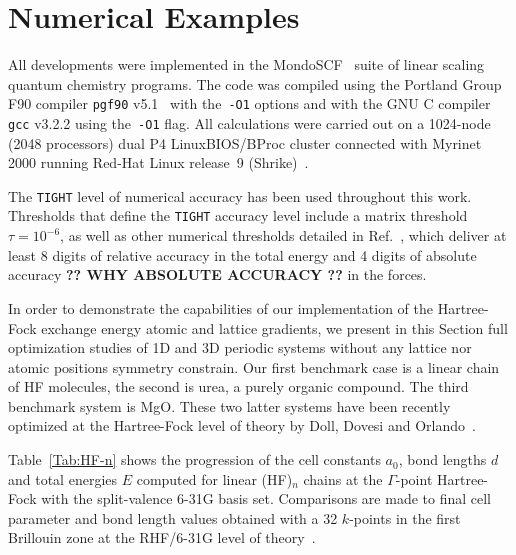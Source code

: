 \documentclass[prl,twocolumn,showpacs,twocolumngrid,superbib]{revtex4}
\begin{document}
\section{Numerical Examples}\label{Sec:NumExamples}
All developments were implemented in the MondoSCF~\cite{MondoSCF} suite of
linear scaling quantum chemistry programs. The code was compiled 
using the Portland Group F90 compiler {\tt pgf90} v5.1~\cite{pgf90} 
with the~{\tt -O1} options and with the GNU C compiler {\tt gcc} 
v3.2.2 using the~{\tt -O1} flag.
All calculations were carried out on a 1024-node (2048 processors)
dual P4 LinuxBIOS/BProc cluster connected with Myrinet 2000 running
Red-Hat Linux release~9 (Shrike)~\cite{RedHat90}.


The {\tt TIGHT} level of numerical accuracy has been used throughout this work.  
Thresholds that define the {\tt TIGHT} accuracy level include a matrix 
threshold $\tau=10^{-6}$, as well as other numerical thresholds 
detailed in Ref.~\cite{CTymczak04a}, which deliver at least 8 digits of 
relative accuracy in the total energy and 4 digits of absolute accuracy 
{\bf ?? WHY ABSOLUTE ACCURACY ??} in the forces.  

In order to demonstrate the capabilities of our implementation of the
Hartree-Fock exchange energy atomic and lattice gradients, we present in this Section 
full optimization studies of 1D and 3D periodic systems without any lattice 
nor atomic positions symmetry constrain. 
Our first benchmark case is a linear chain of HF molecules, the second is
urea, a purely organic compound. The third benchmark system is MgO. 
These two latter systems have been recently optimized at the Hartree-Fock 
level of theory by Doll, Dovesi and Orlando~\cite{KDoll04}.

Table~\ref{Tab:HF-n} shows the progression of the cell constants $a_0$, bond lengths $d$ and
total energies $E$ computed for linear (HF)$_n$ chains at 
the $\Gamma$-point Hartree-Fock with the split-valence 6-31G basis set. 
Comparisons are made to final cell parameter and bond length values obtained 
with a 32 $k$-points in the first Brillouin zone at the 
RHF/6-31G level of theory~\cite{DJacquemin99B}.
\end{document}
